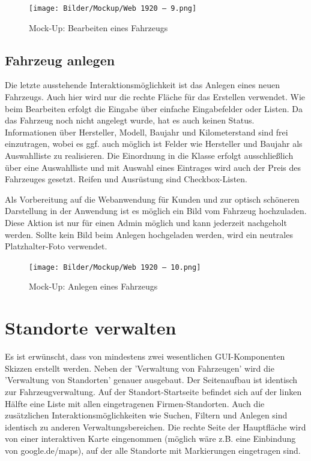 \begin{figure}[!ht]
    \centering
    \texttt{[image: Bilder/Mockup/Web 1920 – 9.png]}
    \caption{Mock-Up: Bearbeiten eines Fahrzeugs}
    \label{mu:bearbeiten}
\end{figure}

\newpage

\subsection{Fahrzeug anlegen}

Die letzte ausstehende Interaktionsmöglichkeit ist das Anlegen eines neuen Fahrzeugs. Auch hier wird nur die rechte Fläche für das Erstellen verwendet. Wie beim Bearbeiten erfolgt die Eingabe über einfache Eingabefelder oder Listen. Da das Fahrzeug noch nicht angelegt wurde, hat es auch keinen Status. Informationen über Hersteller, Modell, Baujahr und Kilometerstand sind frei einzutragen, wobei es ggf. auch möglich ist Felder wie Hersteller und Baujahr als Auswahlliste zu realisieren. Die Einordnung in die Klasse erfolgt ausschließlich über eine Auswahlliste und mit Auswahl eines Eintrages wird auch der Preis des Fahrzeuges gesetzt. Reifen und Ausrüstung sind Checkbox-Listen. 

Als Vorbereitung auf die Webanwendung für Kunden und zur optisch schöneren Darstellung in der Anwendung ist es möglich ein Bild vom Fahrzeug hochzuladen. Diese Aktion ist nur für einen Admin möglich und kann jederzeit nachgeholt werden. Sollte kein Bild beim Anlegen hochgeladen werden, wird ein neutrales Platzhalter-Foto verwendet. 

\begin{figure}[!ht]
    \centering
    \texttt{[image: Bilder/Mockup/Web 1920 – 10.png]}
    \caption{Mock-Up: Anlegen eines Fahrzeugs}
    \label{mu:anlegen}
\end{figure}

\section{Standorte verwalten}

Es ist erwünscht, dass von mindestens zwei wesentlichen GUI-Komponenten Skizzen erstellt werden. Neben der 'Verwaltung von Fahrzeugen' wird die 'Verwaltung von Standorten' genauer ausgebaut. Der Seitenaufbau ist identisch zur Fahrzeugverwaltung. Auf der Standort-Startseite befindet sich auf der linken Hälfte eine Liste mit allen eingetragenen Firmen-Standorten. Auch die zusätzlichen Interaktionsmöglichkeiten wie Suchen, Filtern und Anlegen sind identisch zu anderen Verwaltungsbereichen. Die rechte Seite der Hauptfläche wird von einer interaktiven Karte eingenommen (möglich wäre z.B. eine Einbindung von google.de/maps), auf der alle Standorte mit Markierungen eingetragen sind. 

